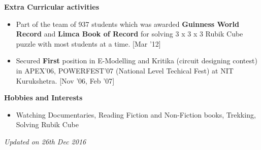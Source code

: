 \documentclass[a4paper,10pt]{article}
\begin{document}



\colorbox{titleColor}{\parbox{6.7in}{\textbf{Extra Curricular activities}}}

\begin{itemize}
  \setlength{\itemsep}{1pt}
  \item Part of the team of 937 students which was awarded \textbf{Guinness World Record} and \textbf{Limca Book of Record} for solving 3   x 3 x 3 Rubik Cube puzzle with most students at a time. \hfill {\small{{[Mar '12]}}\/}
  \item Secured \textbf{First} position in E-Modelling and Kritika (circuit designing contest) in APEX'06, POWERFEST'07 (National Level Techical Fest) at NIT Kurukshetra. \hfill {\small{{[Nov '06, Feb '07]}}\/}
\end{itemize}

\colorbox{titleColor}{\parbox{6.7in}{\textbf{Hobbies and Interests}}}

\begin{itemize}
  \setlength{\itemsep}{1pt}
  \item Watching Documentaries, Reading Fiction and Non-Fiction books, Trekking, Solving Rubik Cube
\end{itemize}

\textit{Updated on 26th Dec 2016}
\end{document}
